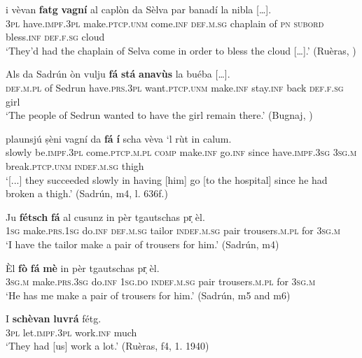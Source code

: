 \ea
\label{ex:causfa1}
\gll    […] i vèvan \textbf{fatg} \textbf{vagní} al caplòn da Sèlva par banadí la nibla […].\\
{}   \textsc{3pl} have.\textsc{impf.3pl} make.\textsc{ptcp.unm} come.\textsc{inf} \textsc{def.m.sg} chaplain of \textsc{pn} \textsc{subord} bless.\textsc{inf} \textsc{def.f.sg} cloud\\
\glt `They’d had the chaplain of Selva come in order to bless the cloud […].' (Ruèras, \citealt[62]{Büchli1966})
\z

\ea
\label{ex:causfa2}
\gll     Als da Sadrún òn vulju \textbf{fá} \textbf{stá} \textbf{anavùs} la buéba […].\\
\textsc{def.m.pl} of Sedrun have.\textsc{prs.3pl} want.\textsc{ptcp.unm} make.\textsc{inf} stay.\textsc{inf} back \textsc{def.f.sg} girl\\
\glt `The people of Sedrun wanted to have the girl remain there.' (Bugnaj, \citealt[131]{Büchli1966})
\z


\ea\label{ex:causfa3}
\gll   [...] plaunsjú ṣèni vagní da \textbf{fá} \textbf{í} scha vèva `l rùt in calum.\\
{} slowly be.\textsc{impf.3pl} come.\textsc{ptcp.m.pl} \textsc{comp} make.\textsc{inf} go.\textsc{inf} since have.\textsc{impf.3sg} \textsc{3sg.m} break.\textsc{ptcp.unm} \textsc{indef.m.sg} thigh \\
\glt `[...] they succeeded slowly in having [him] go [to the hospital] since he had broken a thigh.' (Sadrún, m4, l. 636f.)
\z

\ea
\label{ex:causfa4}
\gll Ju \textbf{fétsch} \textbf{fá} al cusunz in pèr tgautschas pr̩ èl.\\
\textsc{1sg} make.\textsc{prs.1sg} do.\textsc{inf} \textsc{def.m.sg} tailor \textsc{indef.m.sg} pair trousers.\textsc{m.pl} for \textsc{3sg.m}\\
\glt `I have the tailor make a pair of trousers for him.' (Sadrún, m4)
\z

\ea
\label{ex:causfa5}
\gll Èl \textbf{fò} \textbf{fá} \textbf{mè} in pèr tgautschas pr̩ èl.\\
\textsc{3sg.m} make.\textsc{prs.3sg} do.\textsc{inf} \textsc{1sg.do} \textsc{indef.m.sg} pair trousers.\textsc{m.pl} for \textsc{3sg.m}\\
\glt `He has me make a pair of trousers for him.' (Sadrún, m5 and m6)
\z

\ea
\label{ex:causscha1}
\gll I \textbf{schèvan} \textbf{luvrá} fétg.\\
\textsc{3pl} let.\textsc{impf.3pl} work.\textsc{inf} much\\
\glt `They had [us] work a lot.' (Ruèras, f4, 1. 1940)
\z

